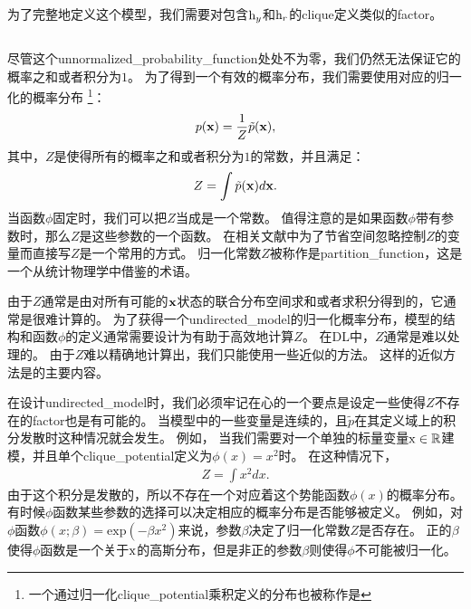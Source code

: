 为了完整地定义这个模型，我们需要对包含$\mathrm{h}_y$和$\mathrm{h}_r$的\gls{clique}定义类似的\gls{factor}。


\subsection{}
\label{sec:the_partition_function}



尽管这个\gls{unnormalized_probability_function}处处不为零，我们仍然无法保证它的概率之和或者积分为$1$。
为了得到一个有效的概率分布，我们需要使用对应的归一化的概率分布
\footnote{一个通过归一化\gls{clique_potential}乘积定义的分布也被称作是}：
\begin{align}
p(\mathbf{x}) = \frac{1}{Z}\tilde{p}(\mathbf{x}),
\end{align}
其中，$Z$是使得所有的概率之和或者积分为$1$的常数，并且满足：
\begin{align}
Z = \int \tilde{p}(\mathbf{x})d\mathbf{x}.
\end{align}
当函数$\phi$固定时，我们可以把$Z$当成是一个常数。
值得注意的是如果函数$\phi$带有参数时，那么$Z$是这些参数的一个函数。
在相关文献中为了节省空间忽略控制$Z$的变量而直接写$Z$是一个常用的方式。
归一化常数$Z$被称作是\gls{partition_function}，这是一个从统计物理学中借鉴的术语。


由于$Z$通常是由对所有可能的$\mathbf{x}$状态的联合分布空间求和或者求积分得到的，它通常是很难计算的。
为了获得一个\gls{undirected_model}的归一化概率分布，模型的结构和函数$\phi$的定义通常需要设计为有助于高效地计算$Z$。
在\gls{DL}中，$Z$通常是难以处理的。
由于$Z$难以精确地计算出，我们只能使用一些近似的方法。
这样的近似方法是的主要内容。


在设计\gls{undirected_model}时，我们必须牢记在心的一个要点是设定一些使得$Z$不存在的\gls{factor}也是有可能的。
当模型中的一些变量是连续的，且$\tilde{p}$在其定义域上的积分发散时这种情况就会发生。
例如， 当我们需要对一个单独的标量变量$\mathrm{x}\in\mathbb{R}$建模，并且单个\gls{clique_potential}定义为$\phi(x) = x^2$时。
在这种情况下，
\begin{align}
Z = \int x^2 dx.
\end{align}
由于这个积分是发散的，所以不存在一个对应着这个势能函数$\phi(x)$的概率分布。
有时候$\phi$函数某些参数的选择可以决定相应的概率分布是否能够被定义。
例如，对$\phi$函数$\phi(x;\beta) = \text{exp}(-\beta x^2)$来说，参数$\beta$决定了归一化常数$Z$是否存在。
正的$\beta$使得$\phi$函数是一个关于$\mathrm{x}$的高斯分布，但是非正的参数$\beta$则使得$\phi$不可能被归一化。


